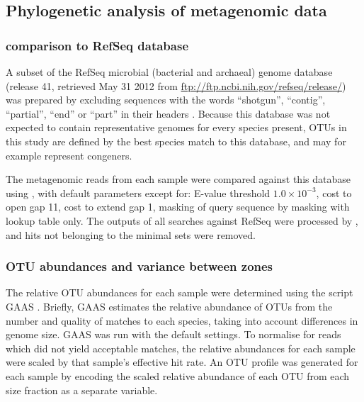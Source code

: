 \subsection{Phylogenetic analysis of metagenomic data}

\subsubsection{ comparison to RefSeq database}

A subset of the RefSeq microbial (bacterial and archaeal) genome database (release 41, retrieved May 31 2012 from \url{ftp://ftp.ncbi.nih.gov/refseq/release/}) was prepared by excluding sequences with the words ``shotgun'', ``contig'', ``partial'', ``end'' or ``part'' in their headers \cite{Angly:2009ip}.
Because this database was not expected to contain representative genomes for every species present, \acp{OTU} in this study are defined by the best species match to this database, and may for example represent congeners.

The metagenomic reads from each sample were compared against this database using , with default parameters except for: E-value threshold $1.0\times{}10^{-3}$, cost to open gap 11, cost to extend gap 1, masking of query sequence by  masking with lookup table only.
The outputs of all  searches against RefSeq were processed by , and hits not belonging to the minimal sets were removed.

\subsubsection{\ac{OTU} abundances and variance between zones}

The relative \ac{OTU} abundances for each sample were determined using the  script \ac{GAAS} \cite{Angly:2009ip}.
Briefly, \ac{GAAS} estimates the relative abundance of \acp{OTU} from the number and quality of  matches to each species, taking into account differences in genome size. 
\ac{GAAS} was run with the default settings. 
To normalise for reads which did not yield acceptable matches, the relative abundances for each sample were scaled by that sample's effective  hit rate. 
An \ac{OTU} profile was generated for each sample by encoding the scaled relative abundance of each \ac{OTU} from each size fraction as a separate variable.

